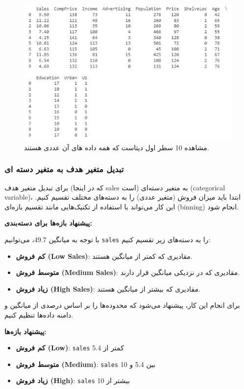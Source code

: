 \documentclass{article}
\begin{document}
\begin{figure}[h!]
    \centering
    \includegraphics[width=0.8\linewidth]{q3_p23.png}
    \caption{مشاهده 10 سطر اول دیتاست که همه داده های آن عددی هستند.}
    \label{fig323}
\end{figure}


\subsubsection{تبدیل متغیر هدف به متغیر دسته ای}

برای تبدیل متغیر هدف (که در اینجا sales است) به متغیر دسته‌ای (categorical variable)، ابتدا باید میزان فروش (متغیر عددی) را به دسته‌های مختلف تقسیم کنیم. این کار می‌تواند با استفاده از تکنیک‌هایی مانند تقسیم بازه‌ای (binning) انجام شود.


\textbf{پیشنهاد بازه‌ها برای دسته‌بندی:}

با توجه به میانگین 49.7، می‌توانیم \texttt{sales} را به دسته‌های زیر تقسیم کنیم:

\begin{itemize}
    \item \textbf{کم فروش (Low Sales)}: مقادیری که کمتر از میانگین هستند.
    \item \textbf{متوسط فروش (Medium Sales)}: مقادیری که در نزدیکی میانگین قرار دارند.
    \item \textbf{زیاد فروش (High Sales)}: مقادیری که بیشتر از میانگین هستند.
\end{itemize}

برای انجام این کار، پیشنهاد می‌شود که محدوده‌ها را بر اساس درصدی از میانگین و دامنه داده‌ها تنظیم کنیم.

\textbf{پیشنهاد بازه‌ها:}

\begin{itemize}
    \item \textbf{کم فروش (Low)}: \texttt{sales} کمتر از 5.4
    \item \textbf{متوسط فروش (Medium)}: \texttt{sales} بین 5.4 و 10
    \item \textbf{زیاد فروش (High)}: \texttt{sales} بیشتر از 10
\end{itemize}
\end{document}
